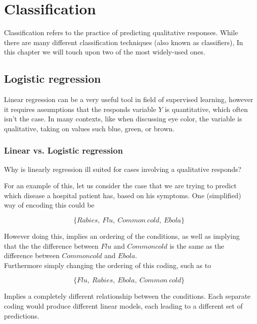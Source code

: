 \graphicspath{{Chapters/2_logistic_regression/}}

\chapter{Classification}

Classification refers to the practice of predicting qualitative responses. While there are many different classification techniques (also known as classifiers), In this chapter we will touch upon two of the most widely-used ones.

\section{Logistic regression}

Linear regression can be a very useful tool in field of supervised learning, however it requires assumptions that the responds variable $Y$ is quantitative, which often isn't the case. In many contexts, like when discussing eye color, the variable is qualitative, taking on values such blue, green, or brown.

\subsection{Linear vs. Logistic regression}

Why is linearly regression ill suited for cases involving a qualitative responds?

For an example of this, let us consider the case that we are trying to predict which disease a hospital patient has, based on his symptoms. One (simplified) way of encoding this could be

$$\{Rabies,\ Flu,\ Common\ cold,\ Ebola\}$$

However doing this, implies an ordering of the conditions, as well as implying that the the difference between $Flu$ and $Common cold$ is the same as the difference between $Common cold$ and $Ebola$.\\
Furthermore simply changing the ordering of this coding, such as to 

$$\{Flu,\ Rabies,\ Ebola,\ Common\ cold\}$$

Implies a completely different relationship between the conditions. Each separate coding would produce different linear models, each leading to a different set of predictions.

